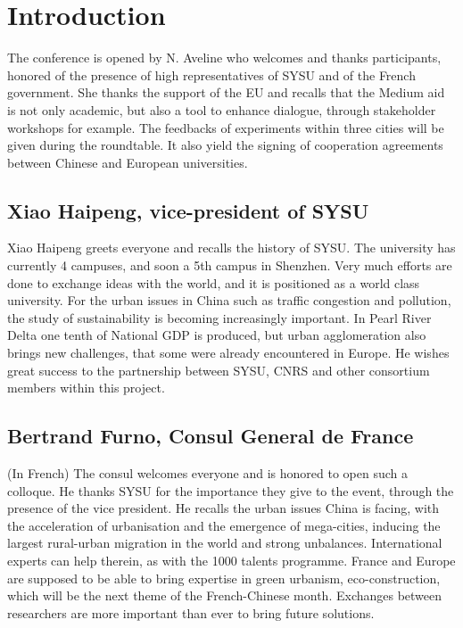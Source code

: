 \documentclass[11pt]{article}
\begin{document}
\section*{Introduction}

The conference is opened by N. Aveline who welcomes and thanks participants, honored of the presence of high representatives of SYSU and of the French government. She thanks the support of the EU and recalls that the Medium aid is not only academic, but also a tool to enhance dialogue, through stakeholder workshops for example. The feedbacks of experiments within three cities will be given during the roundtable. It also yield the signing of cooperation agreements between Chinese and European universities.


\subsection*{Xiao Haipeng, vice-president of SYSU}

Xiao Haipeng greets everyone and recalls the history of SYSU. The university has currently 4 campuses, and soon a 5th campus in Shenzhen. Very much efforts are done to exchange ideas with the world, and it is positioned as a world class university. For the urban issues in China such as traffic congestion and pollution, the study of sustainability is becoming increasingly important. In Pearl River Delta one tenth of National GDP is produced, but urban agglomeration also brings new challenges, that some were already encountered in Europe. He wishes great success to the partnership between SYSU, CNRS and other consortium members within this project.

\subsection*{Bertrand Furno, Consul General de France}


(In French) The consul welcomes everyone and is honored to open such a colloque. He thanks SYSU for the importance they give to the event, through the presence of the vice president. He recalls the urban issues China is facing, with the acceleration of urbanisation and the emergence of mega-cities, inducing the largest rural-urban migration in the world and strong unbalances. International experts can help therein, as with the 1000 talents programme. France and Europe are supposed to be able to bring expertise in green urbanism, eco-construction, which will be the next theme of the French-Chinese month. Exchanges between researchers are more important than ever to bring future solutions.
\end{document}
